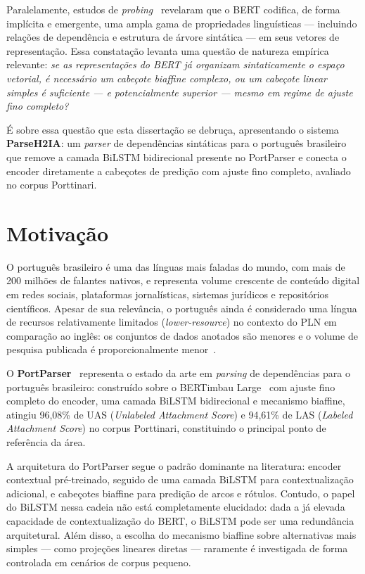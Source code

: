 Paralelamente, estudos de \textit{probing}~\citep{tenney2019bert,hewitt2019structural,jawahar2019does}
revelaram que o BERT codifica, de forma implícita e emergente, uma ampla gama de propriedades
linguísticas — incluindo relações de dependência e estrutura de árvore sintática — em seus
vetores de representação. Essa constatação levanta uma questão de natureza empírica relevante:
\textit{se as representações do BERT já organizam sintaticamente o espaço vetorial, é
necessário um cabeçote biaffine complexo, ou um cabeçote linear simples é suficiente — e
potencialmente superior — mesmo em regime de ajuste fino completo?}

É sobre essa questão que esta dissertação se debruça, apresentando o sistema
\textbf{ParseH2IA}: um \textit{parser} de dependências sintáticas para o português brasileiro
que remove a camada BiLSTM bidirecional presente no PortParser e conecta o encoder diretamente
a cabeçotes de predição com ajuste fino completo, avaliado no corpus Porttinari.

\section{Motivação}
\label{sec:motivacao}

O português brasileiro é uma das línguas mais faladas do mundo, com mais de 200 milhões de
falantes nativos, e representa volume crescente de conteúdo digital em redes sociais,
plataformas jornalísticas, sistemas jurídicos e repositórios científicos. Apesar de sua
relevância, o português ainda é considerado uma língua de recursos relativamente limitados
(\textit{lower-resource}) no contexto do PLN em comparação ao inglês: os conjuntos de dados
anotados são menores e o volume de pesquisa publicada é proporcionalmente menor~\citep{real2020}.

O \textbf{PortParser}~\citep{lopes2024towards} representa o estado da arte em \textit{parsing}
de dependências para o português brasileiro: construído sobre o BERTimbau
Large~\citep{souza2020bertimbau} com ajuste fino completo do encoder, uma camada BiLSTM
bidirecional e mecanismo biaffine, atingiu 96,08\% de UAS (\textit{Unlabeled Attachment Score})
e 94,61\% de LAS (\textit{Labeled Attachment Score}) no corpus Porttinari, constituindo o
principal ponto de referência da área.

A arquitetura do PortParser segue o padrão dominante na literatura: encoder contextual pré-treinado,
seguido de uma camada BiLSTM para contextualização adicional, e cabeçotes biaffine para predição
de arcos e rótulos. Contudo, o papel do BiLSTM nessa cadeia não está completamente
elucidado: dada a já elevada capacidade de contextualização do BERT, o BiLSTM pode ser uma
redundância arquitetural. Além disso, a escolha do mecanismo biaffine sobre alternativas mais
simples — como projeções lineares diretas — raramente é investigada de forma controlada em
cenários de corpus pequeno.

